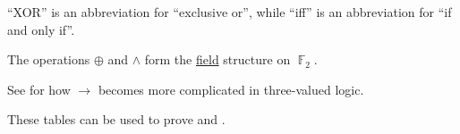 \begin{comments}
  \item \enquote{XOR} is an abbreviation for \enquote{exclusive or}, while \enquote{iff} is an abbreviation for \enquote{if and only if}.

  \item The operations \( \oplus \) and \( \wedge \) form the \hyperref[def:field]{field} structure on \( \BbbF_2 \).

  \item See  for how \( {\rightarrow} \) becomes more complicated in three-valued logic.

  \item These tables can be used to prove  and .
\end{comments}

